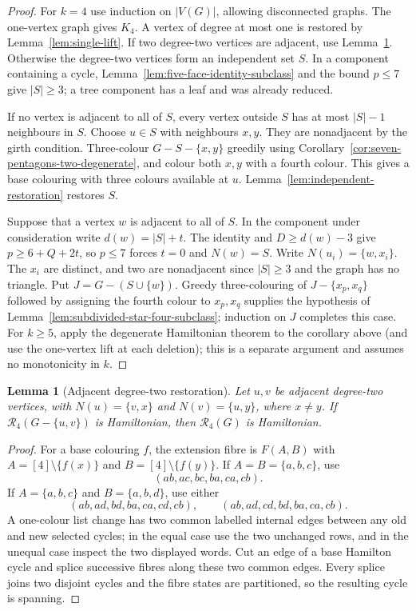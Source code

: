 \documentclass[11pt]{article}
\newtheorem{lemma}[theorem]{Lemma}
\theoremstyle{remark}
\newcommand{\R}{\mathcal R}
\numberwithin{equation}{section}
\numberwithin{table}{section}
\begin{document}
\begin{proof}
For $k=4$ use induction on $|V(G)|$, allowing disconnected graphs.  The
one-vertex graph gives $K_4$.  A vertex of degree at most one is restored by
Lemma~\ref{lem:single-lift}.  If two degree-two vertices are adjacent, use
Lemma~\ref{lem:adjacent-two-four}.  Otherwise the degree-two
vertices form an independent set $S$.  In a component containing a cycle,
Lemma~\ref{lem:five-face-identity-subclass} and the bound $p\le7$ give
$|S|\ge3$; a tree component has a leaf and was already reduced.

If no vertex is adjacent to all of $S$, every vertex outside $S$ has at most
$|S|-1$ neighbours in $S$.  Choose $u\in S$ with neighbours $x,y$.  They are
nonadjacent by the girth condition.  Three-colour $G-S-\{x,y\}$ greedily
using Corollary~\ref{cor:seven-pentagons-two-degenerate}, and colour both
$x,y$ with a fourth colour.  This gives a base colouring with three colours
available at $u$.  Lemma~\ref{lem:independent-restoration} restores $S$.

Suppose that a vertex $w$ is adjacent to all of $S$.  In the component under
consideration write $d(w)=|S|+t$.  The identity and
$D\ge d(w)-3$ give $p\ge6+Q+2t$, so $p\le7$ forces $t=0$ and
$N(w)=S$.  Write $N(u_i)=\{w,x_i\}$.  The $x_i$ are distinct, and two are
nonadjacent since $|S|\ge3$ and the graph has no triangle.  Put
$J=G-(S\cup\{w\})$.  Greedy three-colouring of $J-\{x_p,x_q\}$ followed by
assigning the fourth colour to $x_p,x_q$ supplies the hypothesis of
Lemma~\ref{lem:subdivided-star-four-subclass}; induction on $J$ completes
this case.  For $k\ge5$, apply the degenerate Hamiltonian theorem to the
corollary above (and use the one-vertex lift at each deletion); this is a
separate argument and assumes no monotonicity in $k$.
\end{proof}

\begin{lemma}[Adjacent degree-two restoration]
\label{lem:adjacent-two-four}
Let $u,v$ be adjacent degree-two vertices, with
$N(u)=\{v,x\}$ and $N(v)=\{u,y\}$, where $x\ne y$.  If
$\R_4(G-\{u,v\})$ is Hamiltonian, then $\R_4(G)$ is Hamiltonian.
\end{lemma}
\begin{proof}
For a base colouring $f$, the extension fibre is
$F(A,B)$ with $A=[4]\setminus\{f(x)\}$ and
$B=[4]\setminus\{f(y)\}$.  If $A=B=\{a,b,c\}$, use
\[
(ab,ac,bc,ba,ca,cb).
\]
If $A=\{a,b,c\}$ and $B=\{a,b,d\}$, use either
\[
(ab,ad,bd,ba,ca,cd,cb),\qquad
(ab,ad,cd,bd,ba,ca,cb).
\]
A one-colour list change has two common labelled internal edges between
any old and new selected cycles; in the equal case use the two unchanged
rows, and in the unequal case inspect the two displayed words.  Cut an
edge of a base Hamilton cycle and splice successive fibres along these
two common edges.  Every splice joins two disjoint cycles and the fibre
states are partitioned, so the resulting cycle is spanning.
\end{proof}
\end{document}
